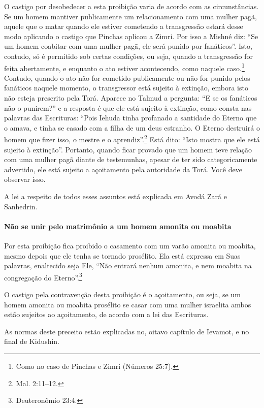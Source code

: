 \begin{multicols}{2}
O castigo por desobedecer a esta proibição varia de acordo com as
circunstâncias. Se um homem mantiver publicamente um relacionamento com
uma mulher pagã, aquele que o matar quando ele estiver cometendo a
transgressão estará desse modo aplicando o castigo que Pinchas\starr{} aplicou a
Zimri\starr. Por isso a Mishné diz: ``Se um homem coabitar com uma mulher
pagã, ele será punido por fanáticos''. Isto, contudo, só é permitido
sob certas condições, ou seja, quando a transgressão for feita
abertamente, e enquanto o ato estiver acontecendo, como naquele
caso.\footnote{Como no caso de Pinchas\starr{} e Zimri\starr{} (Números 25:7).} Contudo, quando o ato não for cometido
publicamente ou não for punido pelos fanáticos naquele momento, o
transgressor está sujeito à extinção, embora isto não esteja prescrito
pela Torá\starr. Aparece no Talmud\starr{} a pergunta: ``E se os fanáticos não o
punirem?'' e a resposta é que ele está sujeito à extinção, como consta
nas palavras das Escrituras: ``Pois Iehuda\starr{} tinha profanado a santidade
do Eterno que o amava, e tinha se casado com a filha de um deus
estranho. O Eterno destruirá o homem que fizer isso, o mestre e o
aprendiz''.\footnote{Mal. 2:11--12.} Está dito: ``Isto mostra que ele está
sujeito à extinção''. Portanto, quando ficar provado que um homem teve
relação com uma mulher pagã diante de testemunhas, apesar de ter sido
categoricamente advertido, ele está sujeito a açoitamento pela
autoridade da Torá\starr. Você deve observar isso.

A lei a respeito de todos esses assuntos está explicada em Avodá Zará\starr{} e Sanhedrin\starr.

\paragraph{Não se unir pelo matrimônio a um homem amonita\starr{} ou moabita\starr}

Por esta proibição fica proibido o casamento com um varão amonita\starr{} ou
moabita\starr, mesmo depois que ele tenha se tornado prosélito. Ela está
expressa em Suas palavras, enaltecido seja Ele, ``Não entrará nenhum
amonita\starr, e nem moabita\starr{} na congregação do Eterno''.\footnote{Deuteronômio 23:4.}

O castigo pela contravenção desta proibição é o açoitamento, ou seja,
se um homem amonita\starr{} ou moabita\starr{} prosélito se casar com uma mulher
israelita ambos estão sujeitos ao açoitamento, de acordo com a lei das
Escrituras.

As normas deste preceito estão explicadas no, oitavo capítulo de
Ievamot\starr, e no final de Kidushin\starr.



\end{multicols}
